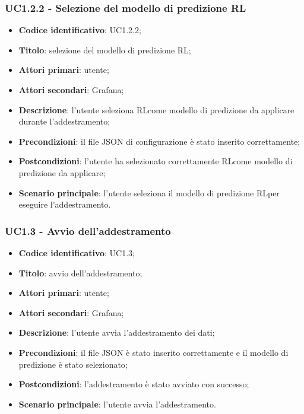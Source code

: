 \subsubsection{UC1.2.2 - Selezione del modello di predizione RL}
\begin{itemize}
	\item \textbf{Codice identificativo}: UC1.2.2;
	\item \textbf{Titolo}: selezione del modello di predizione RL\glo;
	\item \textbf{Attori primari}: utente;
	\item \textbf{Attori secondari}: Grafana\glo;
	\item \textbf{Descrizione}: l'utente seleziona RL\glosp come modello di predizione da applicare durante l'addestramento;
	\item \textbf{Precondizioni}: il file JSON di configurazione è stato inserito correttamente;
	\item \textbf{Postcondizioni}: l'utente ha selezionato correttamente RL\glosp come modello di predizione da applicare;
	\item \textbf{Scenario principale}: l'utente seleziona il modello di predizione RL\glosp per eseguire l'addestramento.
\end{itemize}

\subsubsection{UC1.3 - Avvio dell'addestramento}
\begin{itemize}
	\item \textbf{Codice identificativo}: UC1.3;
	\item \textbf{Titolo}: avvio dell'addestramento;
	\item \textbf{Attori primari}: utente;
	\item \textbf{Attori secondari}: Grafana\glo;
	\item \textbf{Descrizione}: l'utente avvia l'addestramento dei dati;
	\item \textbf{Precondizioni}: il file JSON è stato inserito correttamente e il modello di predizione è stato selezionato;
	\item \textbf{Postcondizioni}: l'addestramento è stato avviato con successo;
	\item \textbf{Scenario principale}: l'utente avvia l'addestramento.
\end{itemize}

